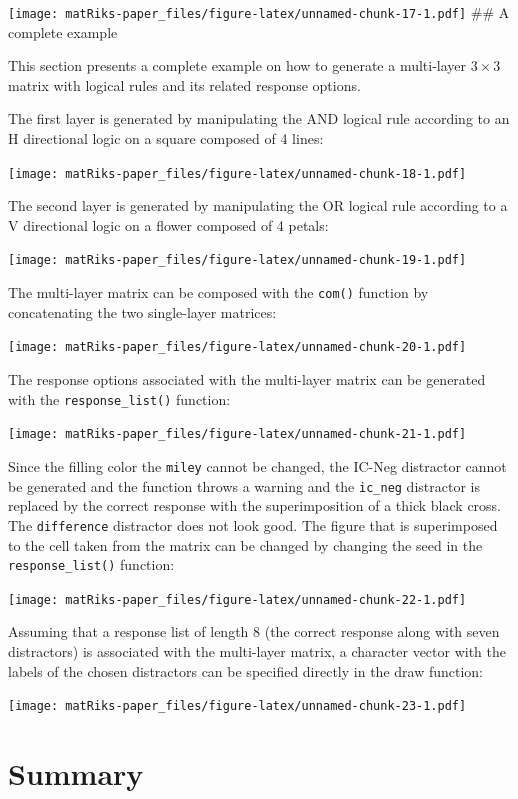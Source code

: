 \texttt{[image: matRiks-paper\_files/figure-latex/unnamed-chunk-17-1.pdf]}
\#\# A complete example

This section presents a complete example on how to generate a multi-layer \(3 \times 3\) matrix with logical rules and its related response options.

The first layer is generated by manipulating the AND logical rule according to an H directional logic on a square composed of 4 lines:

\texttt{[image: matRiks-paper\_files/figure-latex/unnamed-chunk-18-1.pdf]}

The second layer is generated by manipulating the OR logical rule according to a V directional logic on a flower composed of 4 petals:

\texttt{[image: matRiks-paper\_files/figure-latex/unnamed-chunk-19-1.pdf]}

The multi-layer matrix can be composed with the \texttt{com()} function by concatenating the two single-layer matrices:

\texttt{[image: matRiks-paper\_files/figure-latex/unnamed-chunk-20-1.pdf]}

The response options associated with the multi-layer matrix can be generated with the \texttt{response\_list()} function:

\texttt{[image: matRiks-paper\_files/figure-latex/unnamed-chunk-21-1.pdf]}

Since the filling color the \texttt{miley} cannot be changed, the IC-Neg distractor cannot be generated and the function throws a warning and the \texttt{ic\_neg} distractor is replaced by the correct response with the superimposition of a thick black cross.
The \texttt{difference} distractor does not look good. The figure that is superimposed to the cell taken from the matrix can be changed by changing the seed in the \texttt{response\_list()} function:

\texttt{[image: matRiks-paper\_files/figure-latex/unnamed-chunk-22-1.pdf]}

Assuming that a response list of length 8 (the correct response along with seven distractors) is associated with the multi-layer matrix, a character vector with the labels of the chosen distractors can be specified directly in the draw function:

\texttt{[image: matRiks-paper\_files/figure-latex/unnamed-chunk-23-1.pdf]}

\hypertarget{summary}{%
\section{Summary}\label{summary}}

